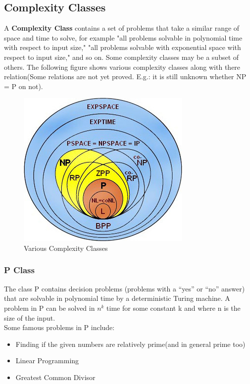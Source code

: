 \subsection{Complexity Classes}
A {\bf Complexity Class} contains a set of problems that take a similar range of space and time to solve, for example "all problems solvable in polynomial time with respect to input size," "all problems solvable with exponential space with respect to input size," and so on. Some complexity classes may be a subset of others. The following figure shows various complexity classes along with there relation(Some relations are not yet proved. E.g.: it is still unknown whether NP = P on not).
\begin{figure}[h!]	
	\centering
	\includegraphics{images/Complexity.jpg}\par
	\caption{Various Complexity Classes}
	\label{fig:complexity}
\end{figure} 

\subsubsection{P Class}
The class P contains decision problems (problems with a \enquote{yes} or \enquote{no} answer) that are solvable in polynomial time by a deterministic Turing machine. A problem in P can be solved in $n^k$ time for some constant k and where n is the size of the input.\\ 
Some famous problems in P include:
\begin{itemize}
\item Finding if the given numbers are relatively prime(and in general prime too)
\item Linear Programming
\item Greatest Common Divisor
\end{itemize}


